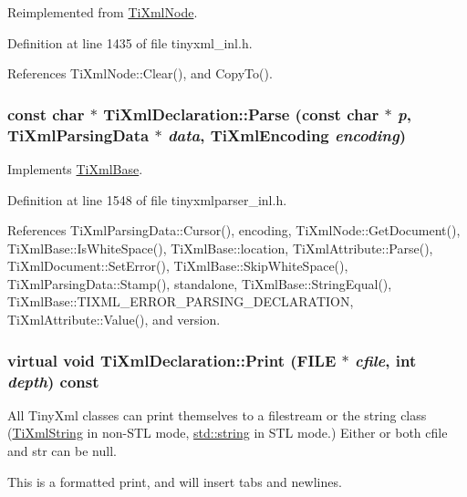 Reimplemented from \hyperlink{class_ti_xml_node_a9eb62a8d95b8a98ec2df481cc9e5a7e2}{TiXmlNode}.

Definition at line 1435 of file tinyxml\_\-inl.h.

References TiXmlNode::Clear(), and CopyTo().\hypertarget{class_ti_xml_declaration_a9839ea97ed687a2b7342fd7b0f04361b}{
\subsubsection[{Parse}]{\setlength{\rightskip}{0pt plus 5cm}const char $\ast$ TiXmlDeclaration::Parse (const char $\ast$ {\em p}, \/  {\bf TiXmlParsingData} $\ast$ {\em data}, \/  {\bf TiXmlEncoding} {\em encoding})}}
\label{class_ti_xml_declaration_a9839ea97ed687a2b7342fd7b0f04361b}


Implements \hyperlink{class_ti_xml_base_a00e4edb0219d00a1379c856e5a1d2025}{TiXmlBase}.

Definition at line 1548 of file tinyxmlparser\_\-inl.h.

References TiXmlParsingData::Cursor(), encoding, TiXmlNode::GetDocument(), TiXmlBase::IsWhiteSpace(), TiXmlBase::location, TiXmlAttribute::Parse(), TiXmlDocument::SetError(), TiXmlBase::SkipWhiteSpace(), TiXmlParsingData::Stamp(), standalone, TiXmlBase::StringEqual(), TiXmlBase::TIXML\_\-ERROR\_\-PARSING\_\-DECLARATION, TiXmlAttribute::Value(), and version.\hypertarget{class_ti_xml_declaration_abf6303db4bd05b5be554036817ff1cb4}{
\subsubsection[{Print}]{\setlength{\rightskip}{0pt plus 5cm}virtual void TiXmlDeclaration::Print (FILE $\ast$ {\em cfile}, \/  int {\em depth}) const}}
\label{class_ti_xml_declaration_abf6303db4bd05b5be554036817ff1cb4}
All TinyXml classes can print themselves to a filestream or the string class (\hyperlink{class_ti_xml_string}{TiXmlString} in non-\/STL mode, \hyperlink{classstd_1_1string}{std::string} in STL mode.) Either or both cfile and str can be null.

This is a formatted print, and will insert tabs and newlines.

